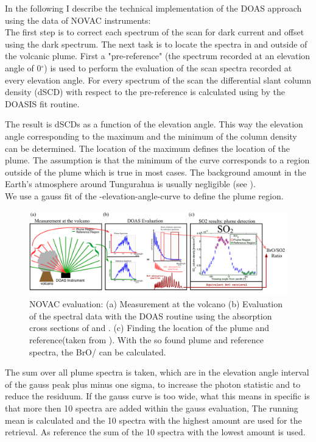 

%
In the following I describe the technical implementation of the DOAS approach using the data of NOVAC instruments:\\
%
The first step is to correct each spectrum of the scan for dark current and offset using the dark spectrum.
The next task is to locate the spectra in and outside of the volcanic plume.
First a "pre-reference" (the spectrum recorded at an elevation angle of  0$^{\circ} $) is used to perform the evaluation of the scan spectra recorded at every elevation angle.
For every spectrum of the scan the  differential slant column density (dSCD) with respect to the pre-reference is calculated using  by the DOASIS fit routine.

The result is  dSCDs as a function of the elevation angle. This way the elevation angle corresponding to the maximum and the minimum of the  column density can be determined. The location of the  maximum defines the location of the plume. The assumption is that the minimum of the  curve corresponds to a region outside of the plume which is true in most cases. The background  amount in the Earth's atmosphere around Tungurahua is usually negligible (see  ). \\
We use a gauss fit of the -elevation-angle-curve to define the plume region.
%
\begin{figure}
	\centering
	\includegraphics[width=1\linewidth]{Bilder/NOVAC_Eval}
	\caption{NOVAC evaluation: (a) Measurement at the volcano (b) Evaluation of the spectral data with the DOAS routine using the absorption cross sections of   and . (c) Finding the location of the plume and reference(taken from \cite{WarnachSimon}). With the so found plume and reference spectra, the BrO/ can be calculated. }
	\label{fig:NOVAC_Eval}
\end{figure}
The sum over all plume spectra is taken, which are in the elevation angle interval of the gauss peak plus minus one sigma, to increase the photon statistic and to reduce the residuum. If the gauss curve is too wide, what this means in specific is that more then 10 spectra are added within the gauss evaluation, The running mean is calculated and the 10 spectra with the highest  amount are used for the retrieval. As reference the sum of the 10 spectra with the lowest  amount is used.\\

